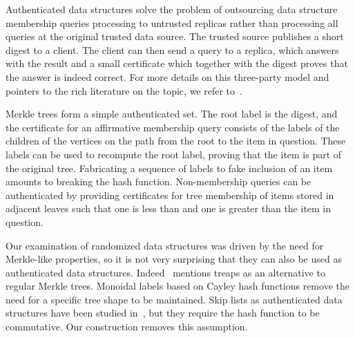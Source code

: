 Authenticated data structures solve the problem of outsourcing data structure membership queries processing to untrusted replicas rather than processing all queries at the original trusted data source. The trusted source publishes a short digest to a client. The client can then send a query to a replica, which answers with the result and a small certificate which together with the digest proves that the answer is indeed correct. For more details on this three-party model and pointers to the rich literature on the topic, we refer to~\cite{martel2004general}.

Merkle trees form a simple authenticated set. The root label is the digest, and the certificate for an affirmative membership query consists of the labels of the children of the vertices on the path from the root to the item in question. These labels can be used to recompute the root label, proving that the item is part of the original tree. Fabricating a sequence of labels to fake inclusion of an item amounts to breaking the hash function. Non-membership queries can be authenticated by providing certificates for tree membership of items stored in adjacent leaves such that one is less than and one is greater than the item in question.

Our examination of randomized data structures was driven by the need for Merkle-like properties, so it is not very surprising that they can also be used as authenticated data structures. Indeed~\cite{naor2000certificate} mentions treaps as an alternative to regular Merkle trees. Monoidal labels based on Cayley hash functions remove the need for a specific tree shape to be maintained. Skip lists as authenticated data structures have been studied in~\cite{goodrich2000efficient}, but they require the hash function to be commutative. Our construction removes this assumption.

